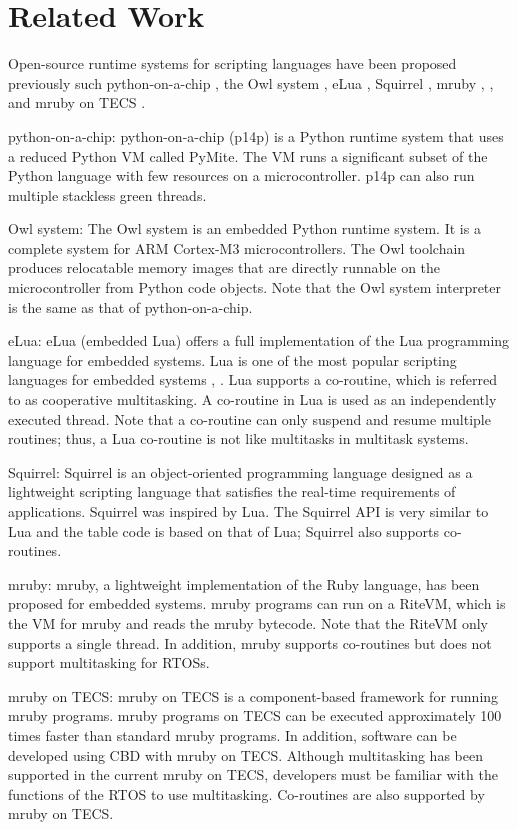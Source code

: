 \documentclass{sig-alternate-05-2015}
\begin{document}
\section{Related Work}
\label{sec:Related work}

Open-source runtime systems for scripting languages have been proposed previously such python-on-a-chip \cite{url:python-on-a-chip}, the Owl system \cite{par:owl}, eLua \cite{url:eLua}, Squirrel \cite{url:Squirrel}, mruby \cite{par:mruby}, \cite{url:mruby}, and mruby on TECS \cite{par:mrubyonTECS}.

{\mybf python-on-a-chip:} python-on-a-chip (p14p) is a Python runtime system that uses a reduced Python VM called PyMite.
The VM runs a significant subset of the Python language with few resources on a microcontroller.
p14p can also run multiple stackless green threads.

{\mybf Owl system:} The Owl system is an embedded Python runtime system.
It is a complete system for ARM Cortex-M3 microcontrollers.
The Owl toolchain produces relocatable memory images that are directly runnable on the microcontroller from Python code objects.
Note that the Owl system interpreter is the same as that of python-on-a-chip.

{\mybf eLua:} eLua (embedded Lua) offers a full implementation of the Lua programming language for embedded systems.
Lua is one of the most popular scripting languages for embedded systems \cite{url:Lua}, \cite{par:Lua}.
Lua supports a co-routine, which is referred to as cooperative multitasking.
A co-routine in Lua is used as an independently executed thread.
Note that a co-routine can only suspend and resume multiple routines; thus, a Lua co-routine is not like multitasks in multitask systems.

{\mybf Squirrel:} Squirrel is an object-oriented programming language designed as a lightweight scripting language that satisfies the real-time requirements of applications.
Squirrel was inspired by Lua.
The Squirrel API is very similar to Lua and the table code is based on that of Lua; Squirrel also supports co-routines.

{\mybf mruby:} mruby, a lightweight implementation of the Ruby language, has been proposed for embedded systems.
mruby programs can run on a RiteVM, which is the VM for mruby and reads the mruby bytecode.
Note that the RiteVM only supports a single thread.
In addition, mruby supports co-routines but does not support multitasking for RTOSs.

{\mybf mruby on TECS:} mruby on TECS is a component-based framework for running mruby programs.
mruby programs on TECS can be executed approximately 100 times faster than standard mruby programs.
In addition, software can be developed using CBD with mruby on TECS.
Although multitasking has been supported in the current mruby on TECS, developers must be familiar with the functions of the RTOS to use multitasking.
Co-routines are also supported by mruby on TECS.
\end{document}
